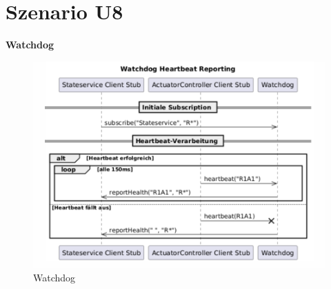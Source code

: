 \section{Szenario U8}
\textbf{Watchdog}\\
\begin{figure}[h!]
	\centering
	\includegraphics[width=0.8\linewidth]{diagrams/watchdog_16_07.png}
	\caption{Watchdog}
	\label{fig:Watchdog}
\end{figure}


















